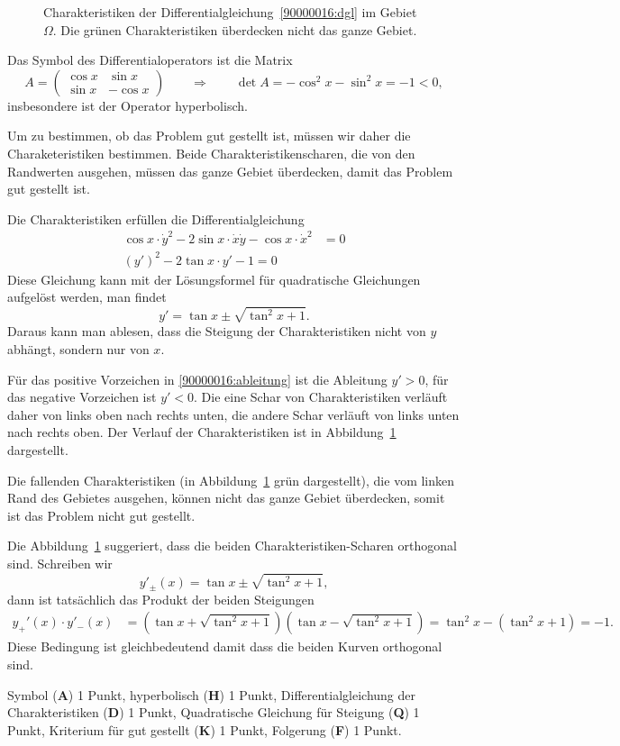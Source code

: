 \begin{loesung}
\begin{figure}
\centering
{}
\caption{Charakteristiken der Differentialgleichung~\eqref{90000016:dgl}
im Gebiet $\Omega$.
Die grünen Charakteristiken überdecken nicht das ganze Gebiet.
\label{90000016:char}}
\end{figure}
Das Symbol des Differentialoperators  ist die Matrix
\[
A
=
\begin{pmatrix} \cos x & \sin x\\ \sin x & -\cos x \end{pmatrix}
\qquad\Rightarrow\qquad
\det A
=
-\cos^2 x -\sin^2 x = -1 < 0,
\]
insbesondere ist der Operator hyperbolisch.

Um zu bestimmen, ob das Problem gut gestellt ist, müssen wir daher die
Charaketeristiken bestimmen.
Beide Charakteristikenscharen, die von den Randwerten ausgehen, müssen das
ganze Gebiet überdecken, damit das Problem gut gestellt ist.

Die Charakteristiken erfüllen die Differentialgleichung
\begin{align*}
\cos x \cdot \dot y^2
-
2\sin x\cdot \dot x \dot y
-
\cos x \cdot \dot x^2
&=
0
\\
(y')^2
-2\tan x\cdot y'
-1
=
0
\end{align*}
Diese Gleichung kann mit der Lösungsformel für quadratische Gleichungen
aufgelöst werden, man findet
\begin{equation}
y' = \tan x\pm \sqrt{\tan^2 x+1}.
\label{90000016:ableitung}
\end{equation}
Daraus kann man ablesen, dass die Steigung der Charakteristiken nicht von
$y$ abhängt, sondern nur von $x$.

Für das positive Vorzeichen in \eqref{90000016:ableitung} ist die
Ableitung $y' > 0$, für das negative Vorzeichen ist $y'<0$.
Die eine Schar von Charakteristiken verläuft daher von links oben
nach rechts unten, die andere Schar verläuft von links unten nach
rechts oben.
Der Verlauf der Charakteristiken ist in Abbildung~\ref{90000016:char}
dargestellt.

Die fallenden Charakteristiken (in Abbildung~\ref{90000016:char} grün
dargestellt), die vom linken Rand des Gebietes
ausgehen, können nicht das ganze Gebiet überdecken, somit ist das
Problem nicht gut gestellt.
\end{loesung}

\begin{diskussion}
Die Abbildung~\ref{90000016:char} suggeriert, dass die beiden
Charakteristiken-Scharen orthogonal sind.
Schreiben wir
\[
y'_\pm(x)
=
\tan x\pm \sqrt{\tan^2 x+1},
\]
dann ist tatsächlich das Produkt der beiden Steigungen
\begin{align*}
y_+'(x)\cdot y'_-(x)
&=
(\tan x + \sqrt{\tan^2 x+1})
(\tan x - \sqrt{\tan^2 x+1})
=
\tan^2x - (\tan^2x+1)
=
-1.
\end{align*}
Diese Bedingung ist gleichbedeutend damit dass die beiden Kurven
orthogonal sind.
\end{diskussion}

\begin{bewertung}
Symbol ({\bf A}) 1 Punkt,
hyperbolisch ({\bf H}) 1 Punkt,
Differentialgleichung der Charakteristiken ({\bf D}) 1 Punkt,
Quadratische Gleichung für Steigung ({\bf Q}) 1 Punkt,
Kriterium für gut gestellt ({\bf K}) 1 Punkt,
Folgerung ({\bf F}) 1 Punkt.
\end{bewertung}

